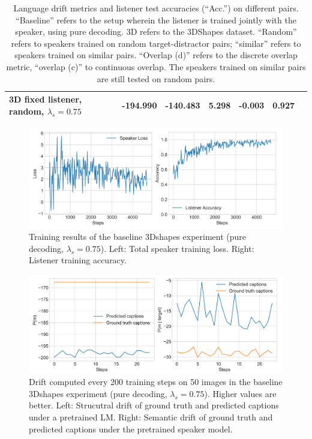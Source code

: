 \begin{table}[]
\begin{tabularx}{\textwidth}{|X|l|l|X|X|X|X|}
		3D fixed listener, random, $\lambda_s = 0.75$&      -194.990          &     -140.483                  &             5.298         &         -0.003            &                   0.927                      &                                           \\ \hline
	\end{tabularx}
	\caption{\label{tab:3dshapes_drift_metrics_basic_baseline} Language drift metrics and listener test accuracies (``Acc.'') on different pairs. 
		``Baseline'' refers to the setup wherein the listener is trained jointly with the speaker, using pure decoding. 3D refers to the 3DShapes dataset. ``Random'' refers to speakers trained on random target-distractor pairs; ``similar'' refers to speakers trained on similar pairs. ``Overlap (d)'' refers to the discrete overlap metric, ``overlap (c)'' to continuous overlap. The speakers trained on similar pairs are still tested on random pairs.}
\end{table}

\begin{figure}[h]
	\centering
	\includegraphics[width=\linewidth]{images/3dshapes_refgame_49_pure_075.png}
	\caption{Training results of the baseline 3Dshapes experiment (pure decoding, $\lambda_s = 0.75$). Left: Total speaker training loss. Right: Listener training accuracy.}
	\label{fig:3dshapes_baseline_075_speaker_loss_listener_acc}
\end{figure}

\begin{figure}
	\centering
	\includegraphics[width=\linewidth]{images/3dshapes_structural_semantic_drift_49_pure_075_random.png}
	\caption{Drift computed every 200 training steps on 50 images in the baseline 3Dshapes experiment (pure decoding, $\lambda_s = 0.75$). Higher values are better. Left: Strucutral drift of ground truth and predicted captions under a pretrained LM. Right: Semantic drift of ground truth and predicted captions under the pretrained speaker model.} 
	\label{fig:3dshapes_baseline_075_str_drift}
\end{figure}

